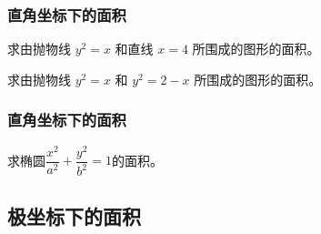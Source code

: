 \documentclass[14pt,notheorems,leqno,xcolor={rgb}]{beamer} %
\begin{document}
\begin{frame}
\frametitle{直角坐标下的面积}
\begin{example}
求由抛物线 $y^2=x$ 和直线 $x=4$ 所围成的图形的面积。
\end{example}
\vpause
\begin{exercise}
求由抛物线 $y^2=x$ 和 $y^2=2-x$ 所围成的图形的面积。
\end{exercise}
\end{frame}

\begin{frame}
\frametitle{直角坐标下的面积}
\begin{example}
求椭圆$\dfrac{x^2}{a^2}+\dfrac{y^2}{b^2}=1$的面积。
\end{example}
\end{frame}

\subsection{极坐标下的面积}
\end{document}
